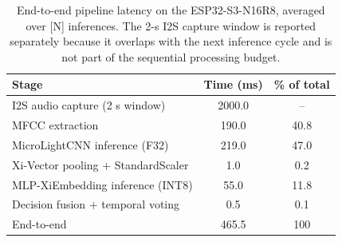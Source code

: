 
\begin{table}[t]
\centering
\caption{End-to-end pipeline latency on the ESP32-S3-N16R8, averaged over [N] inferences. The 2-s I2S capture window is reported separately because it overlaps with the next inference cycle and is not part of the sequential processing budget.}
\label{tab:pipeline_latency}
\begin{tabular}{lcc}
\toprule
Stage & Time (ms) & \% of total \\
\midrule
I2S audio capture (2 s window) & 2000.0 & -- \\
MFCC extraction & 190.0 & 40.8 \\
MicroLightCNN inference (F32) & 219.0 & 47.0 \\
Xi-Vector pooling + StandardScaler & 1.0 & 0.2 \\
MLP-XiEmbedding inference (INT8) & 55.0 & 11.8 \\
Decision fusion + temporal voting & 0.5 & 0.1 \\
\midrule
End-to-end & 465.5 & 100 \\
\bottomrule
\end{tabular}
\end{table}
